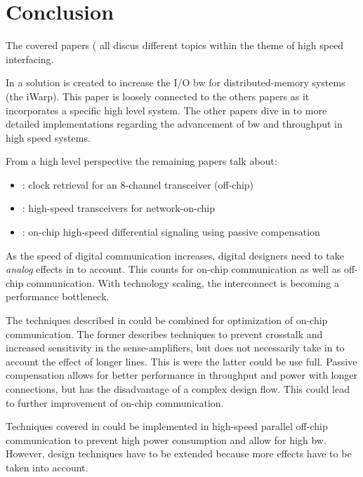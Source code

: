 \section{Conclusion}
The covered papers (\cite{steenkiste1997high, agrawal20098, schinkel2009low, zhang2009high} all discus different topics within the theme of high speed interfacing.

In \cite{steenkiste1997high} a solution is created to increase the I/O \ac{bw} for distributed-memory systems (the iWarp).
This paper is loosely connected to the others papers as it incorporates a specific high level system.
The other papers dive in to more detailed implementations regarding the advancement of \ac{bw} and throughput in high speed systems.

From a high level perspective the remaining papers talk about:
\begin{itemize}
    \item \cite{agrawal20098}: clock retrieval for an 8-channel transceiver (off-chip)
    \item \cite{schinkel2009low}: high-speed transceivers for network-on-chip
    \item \cite{zhang2009high}: on-chip high-speed differential signaling using passive compensation
\end{itemize}

As the speed of digital communication increases, digital designers need to take \textit{analog} effects in to account.
This counts for on-chip communication as well as off-chip communication.
With technology scaling, the interconnect is becoming a performance bottleneck.

The techniques described in \cite{schinkel2009low, zhang2009high} could be combined for optimization of on-chip communication.
The former describes techniques to prevent crosstalk and increased sensitivity in the sense-amplifiers, but does not necessarily take in to account the effect of longer lines.
This is were the latter could be use full. 
Passive compensation allows for better performance in throughput and power with longer connections, but has the disadvantage of a complex design flow.
This could lead to further improvement of on-chip communication.

Techniques covered in \cite{agrawal20098} could be implemented in high-speed parallel off-chip communication to prevent high power consumption and allow for high \ac{bw}.
However, design techniques have to be extended because more effects have to be taken into account.


